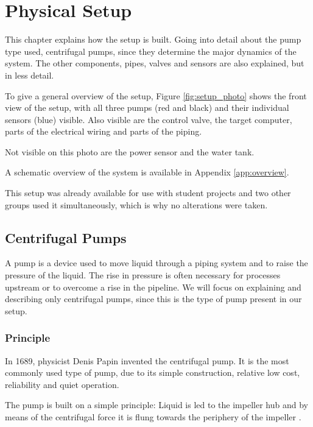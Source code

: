 \chapter{Physical Setup}\label{ch:physsetup}

This chapter explains how the setup is built.
Going into detail about the pump type used,
centrifugal pumps, since they determine the major dynamics of the system.
The other components, pipes, valves and sensors are also explained,
but in less detail.

To give a general overview of the setup,
Figure \ref{fig:setup_photo} shows the front view of the setup,
with all three pumps (red and black) and their individual sensors (blue) visible.
Also visible are the control valve, the target computer,
parts of the electrical wiring and parts of the piping.



Not visible on this photo are the power sensor and the water tank.

A schematic overview of the system is available in Appendix \ref{app:overview}.

This setup was already available for use with student projects
and two other groups used it simultaneously,
which is why no alterations were taken.

\section{Centrifugal Pumps}
A pump is a device used to move liquid through a piping system and to 
raise the pressure of the liquid.
The rise in pressure is often necessary for processes upstream
or to overcome a rise in the pipeline.
We will focus on explaining and describing only centrifugal pumps,
since this is the type of pump present in our setup. 

\subsection{Principle}
In 1689, physicist Denis Papin invented the centrifugal pump. 
It is the most commonly used type of pump, due to its simple construction,
relative low cost, reliability and quiet operation.

The pump is built on a simple principle:
Liquid is led to the impeller hub
and by means of the centrifugal force it is flung towards the periphery of 
the impeller \cite{PumpHandbook}.

